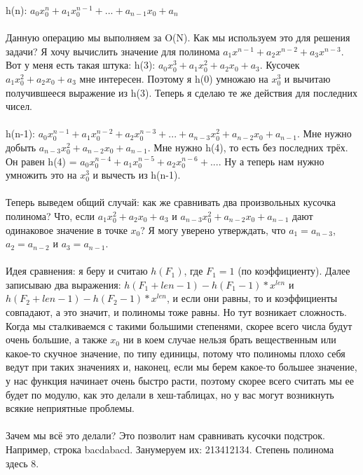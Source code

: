 \documentclass[a4paper,12pt]{article}
\begin{document}
h(n): $a_{0}x_{0}^{n} + a_{1}x_{0}^{n-1} + ... + a_{n-1}x_{0} + a_{n}$\\ \\
Данную операцию мы выполняем за O(N). Как мы используем это для решения задачи? Я хочу вычислить значение для полинома $a_{1}x^{n-1} + a_{2}x^{n-2} + a_{3}x^{n-3}$. Вот у меня есть такая штука: h(3): $a_{0}x_{0}^{3} + a_{1}x_{0}^{2} + a_{2}x_{0} + a_{3}$. Кусочек $a_{1}x_{0}^{2} + a_{2}x_{0} + a_{3}$ мне интересен. Поэтому я h(0) умножаю на $x_{0}^{3}$ и вычитаю получившееся выражение из h(3). Теперь я сделаю те же действия для последних чисел. \\ \\
h(n-1): $a_{0}x_{0}^{n-1} + a_{1}x_{0}^{n-2} + a_{2}x_{0}^{n-3} + ... + a_{n-3}x_{0}^{2} + a_{n-2}x_{0} + a_{n-1}$. Мне нужно добыть $a_{n-3}x_{0}^{2} + a_{n-2}x_{0} + a_{n-1}$. Мне нужно h(4), то есть без последних трёх. Он равен h(4) = $a_{0}x_{0}^{n-4} + a_{1}x_{0}^{n-5} + a_{2}x_{0}^{n-6} + ...$. Ну а теперь нам нужно умножить это на $x_{0}^3$ и вычесть из h(n-1). \\
\\
Теперь выведем общий случай: как же сравнивать два произвольных кусочка полинома? Что, если $a_{1}x_{0}^{2} + a_{2}x_{0} + a_{3}$ и $a_{n-3}x_{0}^{2} + a_{n-2}x_{0} + a_{n-1}$ дают одинаковое значение в точке $x_{0}$? Я могу уверено утверждать, что $a_{1} = a_{n-3}$, $a_{2} = a_{n-2}$ и $a_{3} = a_{n-1}$. \\
\\
Идея сравнения: я беру и считаю $h(F_{1})$, где $F_{1} = 1$ (по коэффициенту). Далее записываю два выражения: $h(F_{1} + len - 1) - h(F_{1} - 1) * x^{len}$ и $h(F_{2} + len - 1) - h(F_{2} - 1) * x^{len}$, и если они равны, то и коэффициенты совпадают, а это значит, и полиномы тоже равны. Но тут возникает сложность. Когда мы сталкиваемся с такими большими степенями, скорее всего числа будут очень большие, а также $x_0$ ни в коем случае нельзя брать вещественным или какое-то скучное значение, по типу единицы, потому что полиномы плохо себя ведут при таких значениях и, наконец, если мы берем какое-то большее значение, у нас функция начинает очень быстро расти, поэтому скорее всего считать мы ее будет по модулю, как это делали в хеш-таблицах, но у вас могут возникнуть всякие неприятные проблемы.\\ \\
Зачем мы всё это делали? Это позволит нам сравнивать кусочки подстрок. Например, строка bacdabacd. Занумеруем их: 213412134. Степень полинома здесь 8.\\ \\
\end{document}
